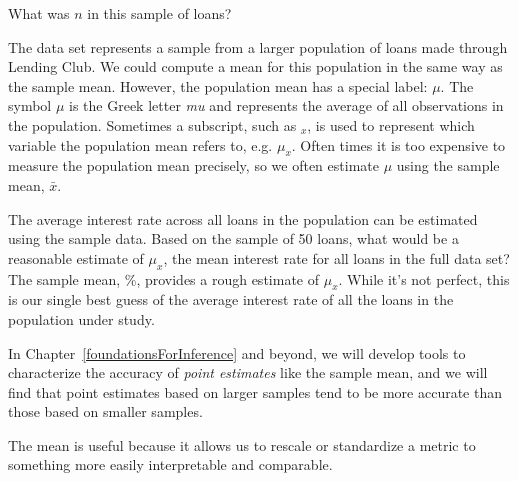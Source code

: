 \begin{exercisewrap}
\begin{nexercise}
What was $n$ in this sample of
loans?\footnotemark{}
\end{nexercise}
\end{exercisewrap}

The  data set represents a sample from
a larger population of loans made through Lending Club.
We could compute a mean for this population in the same way
as the sample mean.
However, the population mean has a special label: $\mu$.
The symbol $\mu$ is the Greek letter \emph{mu} and represents
the average of all observations in the population.
Sometimes a subscript, such as $_x$,
is used to represent which variable the population mean
refers to, e.g. $\mu_x$.
Often times it is too expensive to measure the
population mean precisely, so we often estimate
$\mu$ using the sample mean, $\bar{x}$.

\begin{examplewrap}
\begin{nexample}{The average interest rate across all loans
  in the population can be estimated using the sample data.
  Based on the sample of 50 loans,
  what would be a reasonable estimate of $\mu_x$,
  the mean interest rate for all loans in the
  full data set?}
The sample mean, \loanAvg{}\%, provides a rough estimate
of $\mu_x$.
While it's not perfect, this is our single best guess
of the average interest rate of all the loans in the
population under study.

In Chapter~\ref{foundationsForInference} and beyond,
we will develop tools to characterize the accuracy
of \emph{point estimates}
like the sample mean,
and we will find that point estimates
based on larger samples tend to be more accurate than
those based on smaller samples.
\end{nexample}
\end{examplewrap}

The mean is useful because it allows us to
rescale or standardize a metric to something more easily
interpretable and comparable.

